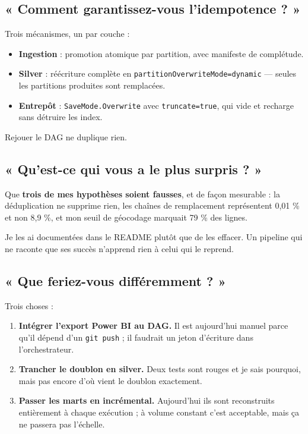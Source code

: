 \documentclass[11pt,a4paper]{article}
\newcommand{\cmd}[1]{\texttt{\small #1}}
\begin{document}
\subsection{« Comment garantissez-vous l'idempotence ? »}

Trois mécanismes, un par couche :

\begin{itemize}
  \item \textbf{Ingestion} : promotion atomique par partition, avec manifeste
        de complétude.
  \item \textbf{Silver} : réécriture complète en
        \cmd{partitionOverwriteMode=dynamic} — seules les partitions produites
        sont remplacées.
  \item \textbf{Entrepôt} : \cmd{SaveMode.Overwrite} avec
        \cmd{truncate=true}, qui vide et recharge sans détruire les index.
\end{itemize}

Rejouer le DAG ne duplique rien.

\subsection{« Qu'est-ce qui vous a le plus surpris ? »}

Que \textbf{trois de mes hypothèses soient fausses}, et de façon mesurable :
la déduplication ne supprime rien, les chaînes de remplacement représentent
0,01 \% et non 8,9 \%, et mon seuil de géocodage marquait 79 \% des lignes.

Je les ai documentées dans le README plutôt que de les effacer. Un pipeline
qui ne raconte que ses succès n'apprend rien à celui qui le reprend.

\subsection{« Que feriez-vous différemment ? »}

Trois choses :

\begin{enumerate}
  \item \textbf{Intégrer l'export Power BI au DAG.} Il est aujourd'hui manuel
        parce qu'il dépend d'un \cmd{git push} ; il faudrait un jeton
        d'écriture dans l'orchestrateur.
  \item \textbf{Trancher le doublon en silver.} Deux tests sont rouges et je
        sais pourquoi, mais pas encore d'où vient le doublon exactement.
  \item \textbf{Passer les marts en incrémental.} Aujourd'hui ils sont
        reconstruits entièrement à chaque exécution ; à volume constant c'est
        acceptable, mais ça ne passera pas l'échelle.
\end{enumerate}
\end{document}
